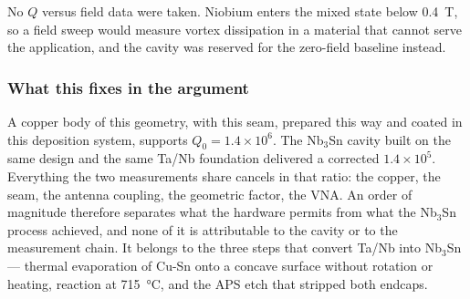 
No $Q$ versus field data were taken. Niobium enters the mixed state below \qty{0.4}{\tesla}, so a field sweep would measure vortex dissipation in a material that cannot serve the application, and the cavity was reserved for the zero-field baseline instead.

\subsubsection{What this fixes in the argument}

A copper body of this geometry, with this seam, prepared this way and coated in this deposition system, supports $Q_0 = 1.4\times10^{6}$. The Nb$_3$Sn cavity built on the same design and the same Ta/Nb foundation delivered a corrected $1.4\times10^{5}$. Everything the two measurements share cancels in that ratio: the copper, the seam, the antenna coupling, the geometric factor, the VNA. An order of magnitude therefore separates what the hardware permits from what the Nb$_3$Sn process achieved, and none of it is attributable to the cavity or to the measurement chain. It belongs to the three steps that convert Ta/Nb into Nb$_3$Sn --- thermal evaporation of Cu-Sn onto a concave surface without rotation or heating, reaction at \qty{715}{\degreeCelsius}, and the APS etch that stripped both endcaps.

